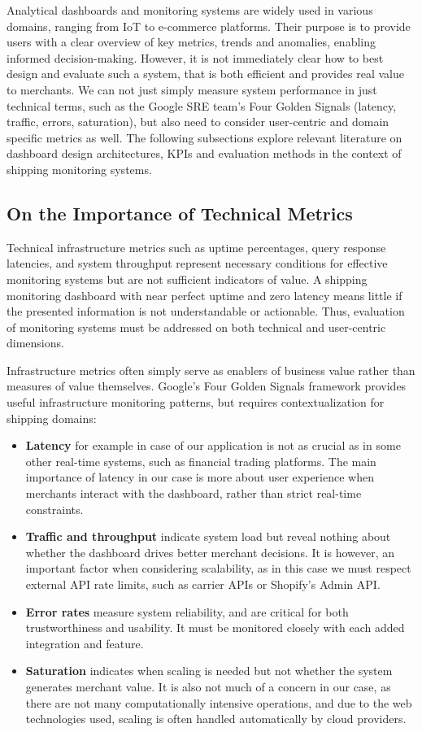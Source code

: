 \documentclass{imc-inf}
\begin{document}
Analytical dashboards and monitoring systems are widely used in various domains, ranging from IoT to e-commerce platforms.
Their purpose is to provide users with a clear overview of key metrics, trends and anomalies, enabling informed decision-making.
However, it is not immediately clear how to best design and evaluate such a system, that is both efficient and provides real value to merchants.
We can not just simply measure system performance in just technical terms, such as the Google SRE team's Four Golden Signals \cite{GoogleSREMonitoring} (latency, traffic, errors, saturation), but also need to consider user-centric and domain specific metrics as well.
The following subsections explore relevant literature on dashboard design architectures, KPIs and evaluation methods in the context of shipping monitoring systems.

\subsection{On the Importance of Technical Metrics}
Technical infrastructure metrics such as uptime percentages, query response latencies, and system throughput represent necessary conditions for effective monitoring systems but are not sufficient indicators of value.
A shipping monitoring dashboard with near perfect uptime and zero latency means little if the presented information is not understandable or actionable.
Thus, evaluation of monitoring systems must be addressed on both technical and user-centric dimensions.

Infrastructure metrics often simply serve as enablers of business value rather than measures of value themselves.
Google's Four Golden Signals framework \cite{GoogleSREMonitoring} provides useful infrastructure monitoring patterns, but requires contextualization for shipping domains:

\begin{itemize}[itemsep=3pt]
  \item \textbf{Latency} for example in case of our application is not as crucial as in some other real-time systems, such as financial trading platforms. The main importance of latency in our case is more about user experience when merchants interact with the dashboard, rather than strict real-time constraints.
  \item \textbf{Traffic and throughput} indicate system load but reveal nothing about whether the dashboard drives better merchant decisions. It is however, an important factor when considering scalability, as in this case we must respect external API rate limits, such as carrier APIs or Shopify's Admin API.
  \item \textbf{Error rates} measure system reliability, and are critical for both trustworthiness and usability. It must be monitored closely with each added integration and feature.
  \item \textbf{Saturation} indicates when scaling is needed but not whether the system generates merchant value. It is also not much of a concern in our case, as there are not many computationally intensive operations, and due to the web technologies used, scaling is often handled automatically by cloud providers.
\end{itemize}
\end{document}
